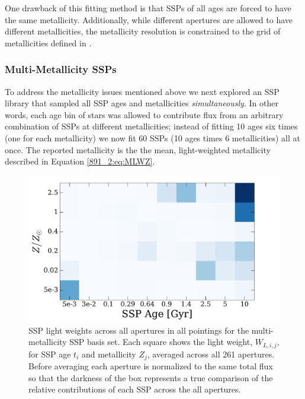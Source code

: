 One drawback of this fitting method is that SSPs of all ages are
forced to have the same metallicity. Additionally, while different
apertures are allowed to have different metallicities, the metallicity
resolution is constrained to the grid of metallicities defined in
\citet{Bruzual03}.

\subsubsection{Multi-Metallicity SSPs}
\label{891_2:sec:multi_metal}
To address the metallicity issues mentioned above we next explored an
SSP library that sampled all SSP ages and metallicities
\emph{simultaneously}. In other words, each age bin of stars was
allowed to contribute flux from an arbitrary combination of SSPs at
different metallicities; instead of fitting 10 ages six times (one for
each metallicity) we now fit 60 SSPs (10 ages times 6 metallicities)
all at once. The reported metallicity is the the mean, light-weighted
metallicity described in Equation \ref{891_2:eq:MLWZ}.

\begin{figure}
  \centering
  \includegraphics[width=\columnwidth]{891_2/figs/allZ2_all_weights.pdf}
  \caption[Example of SSP ligh-weights for 61 parameter
    fit]{\fixspacing\label{891_2:fig:multiZ_weights}SSP light weights
    across all apertures in all pointings for the multi-metallicity
    SSP basis set. Each square shows the light weight, $W_{L,i,j}$,
    for SSP age $t_i$ and metallicity $Z_j$, averaged across all 261
    apertures. Before averaging each aperture is normalized to the
    same total flux so that the darkness of the box represents a true
    comparison of the relative contributions of each SSP across the
    all apertures.}
\end{figure}

